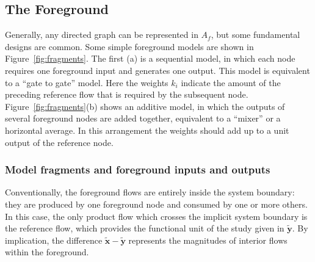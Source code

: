 \subsection{The Foreground}



Generally, any directed graph can be represented in $A_f$, but some fundamental designs are common.  Some simple foreground models are shown in Figure~\ref{fig:fragments}.  The first (a) is a sequential model, in which each node requires one foreground input and generates one output. This model is equivalent to a ``gate to gate'' model.  Here the weights $k_i$ indicate the amount of the preceding reference flow that is required by the subsequent node.  Figure~\ref{fig:fragments}(b) shows an additive model, in which the outputs of several foreground nodes are added together, equivalent to a ``mixer'' or a horizontal average.  In this arrangement the weights %
should add up to a unit output of the reference node. 

\subsubsection{Model fragments and foreground inputs and outputs}

Conventionally, the foreground flows are entirely inside the system boundary: they are produced by one foreground node and consumed by one or more others.  In this case, the only product flow which crosses the implicit system boundary is the reference flow, which provides the functional unit of the study given in $\tilde{\mathbf{y}}$.  By implication, the difference $\tilde{\mathbf{x}} - \tilde{\mathbf{y}}$ represents the magnitudes of interior flows within the foreground. 
   
